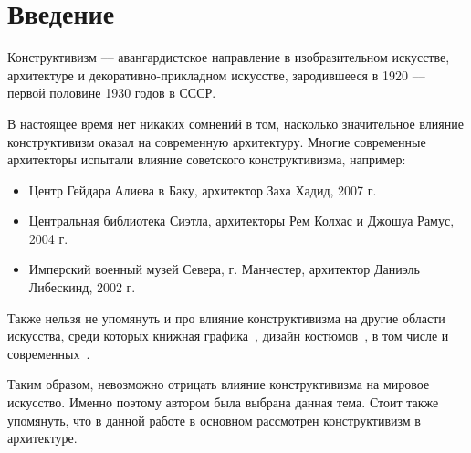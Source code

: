 \chapter*{Введение}
Конструктивизм --– авангардистское направление в изобразительном
искусстве, архитектуре и декоративно-прикладном искусстве,
зародившееся в 1920 –-- первой половине 1930 годов в СССР.


В настоящее время нет никаких сомнений в том, насколько значительное влияние конструктивизм
оказал на современную архитектуру.
Многие современные архитекторы испытали влияние советского конструктивизма, например:
\begin{itemize}
    \item Центр Гейдара Алиева в Баку, архитектор Заха Хадид, 2007 г.
    \item Центральная библиотека Сиэтла, архитекторы Рем Колхас и Джошуа Рамус, 2004 г.
    \item Имперский военный музей Севера, г. Манчестер, архитектор Даниэль Либескинд, 2002 г.
\end{itemize}

Также нельзя не упомянуть и про влияние конструктивизма на другие области искусства, среди которых
книжная графика~\cite{ли2018феномен}, дизайн костюмов~\cite{будникова2022формула},
в том числе и современных~\cite{кумпан2022ретроспектива}.

Таким образом, невозможно отрицать влияние конструктивизма на мировое искусство.
Именно поэтому автором была выбрана данная тема.
Стоит также упомянуть, что в данной работе в основном рассмотрен конструктивизм в архитектуре.

